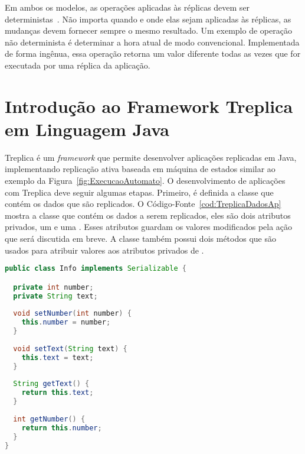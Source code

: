 Em ambos os modelos, as operações aplicadas às réplicas devem ser deterministas~\cite{vieira2010implementation}. Não importa quando e onde elas sejam aplicadas às réplicas, as mudanças devem fornecer sempre o mesmo resultado. Um exemplo de operação não determinista é determinar a hora atual de modo convencional. Implementada de forma ingênua, essa operação retorna um valor diferente todas as vezes que for executada por uma réplica da aplicação.

\section{Introdução ao Framework Treplica em Linguagem Java}
\label{sec:treplicajavaint}

Treplica é um \textit{framework} que permite desenvolver aplicações replicadas em Java, implementando replicação ativa baseada em máquina de estados similar ao exemplo da Figura~\ref{fig:ExecucaoAutomato}. O desenvolvimento de aplicações com Treplica deve seguir algumas etapas. Primeiro, é definida a classe que contém os dados que são replicados. O Código-Fonte~\ref{cod:TreplicaDadosAp} mostra a classe  que contém os dados a serem replicados, eles são dois atributos privados, um  e uma . Esses atributos guardam os valores modificados pela ação que será discutida em breve. A classe  também possui dois métodos que são usados para atribuir valores aos atributos privados de .

\begin{lstlisting}[language=Java, caption={Exemplo de classe que contém os dados que são replicados}, label={cod:TreplicaDadosAp}]
public class Info implements Serializable {

  private int number;
  private String text;
	
  void setNumber(int number) {
    this.number = number;
  }
	
  void setText(String text) {
    this.text = text;
  }
	
  String getText() {
    return this.text;
  }
  
  int getNumber() {
    return this.number;
  }
}
\end{lstlisting}


